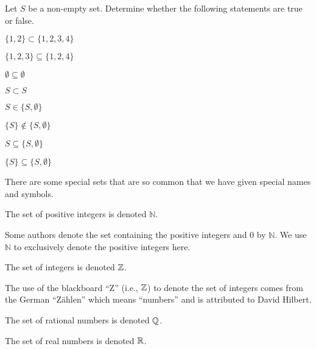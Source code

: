 \begin{exercise}
    Let $S$ be a non-empty set. Determine whether the following statements are true or false.

    \begin{multicols}{2}
        \begin{partquestions}{\alph*}
            \item $\{1, 2\} \subset \{1, 2, 3, 4\}$
            \item $\{1, 2, 3\} \subseteq \{1, 2, 4\}$
            \item $\emptyset \subseteq \emptyset$
            \item $S \subset S$
            \item $S \in \{S, \emptyset\}$
            \item $\{S\} \notin \{S, \emptyset\}$
            \item $S \subseteq \{S, \emptyset\}$
            \item $\{S\} \subseteq \{S, \emptyset\}$
        \end{partquestions}
    \end{multicols}
\end{exercise}

There are some special sets that are so common that we have given special names and symbols.
\begin{definition}
    The set of positive integers is denoted $\mathbb{N}$.
\end{definition}
\begin{remark}
    Some authors denote the set containing the positive integers and 0 by $\mathbb{N}$. We use $\mathbb{N}$ to exclusively denote the positive integers here.
\end{remark}
\begin{definition}
    The set of integers  is denoted $\mathbb{Z}$.
\end{definition}
\begin{remark}
    The use of the blackboard ``Z'' (i.e., $\mathbb{Z}$) to denote the set of integers comes from the German ``Z\"{a}hlen'' which means ``numbers'' and is attributed to David Hilbert.
\end{remark}
\begin{definition}
    The set of rational numbers is denoted $\mathbb{Q}$.
\end{definition}
\begin{definition}
    The set of real numbers is denoted $\mathbb{R}$.
\end{definition}

